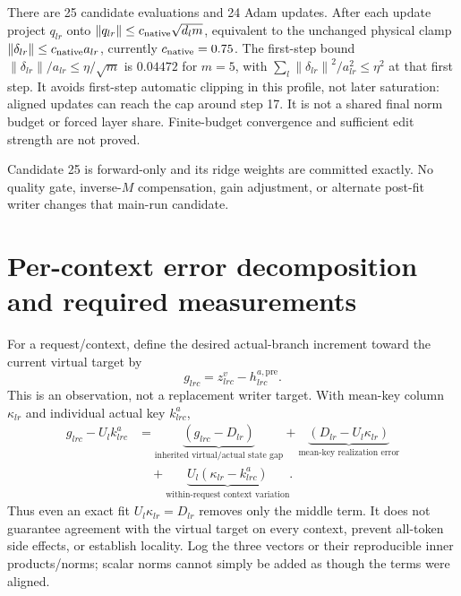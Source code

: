 \documentclass[10pt]{article}
\newcommand{\norm}[1]{\left\lVert#1\right\rVert}
\begin{document}
There are 25 candidate evaluations and 24 Adam updates. After each update
project $q_{lr}$ onto $\norm{q_{lr}}\leq c_{\rm native}\sqrt{d_lm}$,
equivalent to the unchanged physical clamp
$\norm{\delta_{lr}}\leq c_{\rm native}a_{lr}$, currently $c_{\rm native}=0.75$.
The first-step bound $\norm{\delta_{lr}}/a_{lr}\leq\eta/\sqrt m$
is $0.04472$ for $m=5$, with
$\sum_l\norm{\delta_{lr}}^2/a_{lr}^2\leq\eta^2$ at that first step.
It avoids first-step automatic clipping in this
profile, not later saturation: aligned updates can reach the cap around
step 17. It is not a shared final norm budget or forced layer share.
Finite-budget convergence and sufficient edit strength are not proved.

Candidate 25 is forward-only and its ridge weights are committed exactly.
No quality gate, inverse-$M$ compensation, gain adjustment, or alternate
post-fit writer changes that main-run candidate.

\newpage
\section{Per-context error decomposition and required measurements}
For a request/context, define the desired actual-branch increment toward
the current virtual target by
\[
 g_{lrc}=z^v_{lrc}-h^{a,\mathrm{pre}}_{lrc}.
\]
This is an observation, not a replacement writer target. With mean-key
column $\kappa_{lr}$ and individual actual key $k^a_{lrc}$,
\begin{align}
 g_{lrc}-U_lk^a_{lrc}
 &=\underbrace{(g_{lrc}-D_{lr})}_{\text{inherited virtual/actual state gap}}
 +\underbrace{(D_{lr}-U_l\kappa_{lr})}_{\text{mean-key realization error}}
 \nonumber\\[-2pt]
 &\hspace{1em}
 +\underbrace{U_l(\kappa_{lr}-k^a_{lrc})}_{\text{within-request context variation}}.
 \label{eq:decomposition}
\end{align}
Thus even an exact fit $U_l\kappa_{lr}=D_{lr}$ removes only the middle
term. It does not guarantee agreement with the virtual target on every
context, prevent all-token side effects, or establish locality. Log the
three vectors or their reproducible inner products/norms; scalar norms
cannot simply be added as though the terms were aligned.
\end{document}
